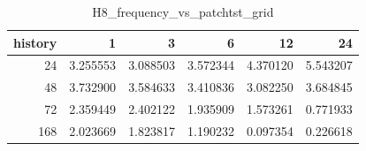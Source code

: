 \begin{table}
\caption{H8_frequency_vs_patchtst_grid}
\label{tab:H8_frequency_vs_patchtst_grid}
\begin{tabular}{rrrrrr}
\toprule
history & 1 & 3 & 6 & 12 & 24 \\
\midrule
24 & 3.255553 & 3.088503 & 3.572344 & 4.370120 & 5.543207 \\
48 & 3.732900 & 3.584633 & 3.410836 & 3.082250 & 3.684845 \\
72 & 2.359449 & 2.402122 & 1.935909 & 1.573261 & 0.771933 \\
168 & 2.023669 & 1.823817 & 1.190232 & 0.097354 & 0.226618 \\
\bottomrule
\end{tabular}
\end{table}
